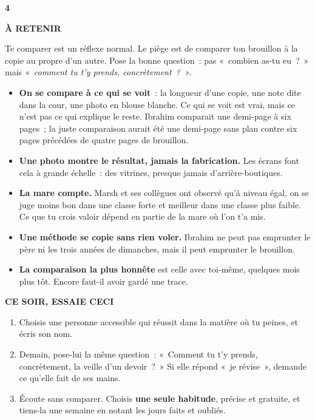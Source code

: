 \documentclass[10pt,twoside,openany]{book}
\newenvironment{aretenir}[1][À retenir]{\par\begin{tcolorbox}[enhanced,colback=creme,colframe=accent,boxrule=0pt,leftrule=3pt,arc=0pt,left=8pt,right=8pt,top=5pt,bottom=5pt,breakable]{\small\bfseries\color{accent}\MakeUppercase{#1}}\par\smallskip}{\end{tcolorbox}\par}
\newenvironment{cesoir}[1][Ce soir, essaie ceci]{\par\begin{tcolorbox}[enhanced,colback=white,colframe=vert,boxrule=0.6pt,arc=2pt,left=8pt,right=8pt,top=5pt,bottom=5pt,breakable]{\small\bfseries\color{vert}\MakeUppercase{#1}}\par\smallskip\small}{\end{tcolorbox}\par}
\newcommand{\fiche}[3]{\clearpage\markright{#2}\thispagestyle{plain}%
 {\noindent\color{accent}\fontsize{40}{40}\selectfont\bfseries #1}\hspace{0.6em}{\Large\bfseries #2\par}\vspace{0.1em}{\small\color{gris}\itshape #3\par}\vspace{0.5em}}
\begin{document}
\fiche{4}{Le cahier du voisin}{Chapitre 4 du livre}
\begin{aretenir}
Te comparer est un réflexe normal. Le piège est de comparer ton brouillon à la copie au propre d’un autre. Pose la bonne question : pas « combien as-tu eu ? » mais \emph{« comment tu t’y prends, concrètement ? »}.
\end{aretenir}
\begin{itemize}
\item \textbf{On se compare à ce qui se voit} : la longueur d’une copie, une note dite dans la cour, une photo en blouse blanche. Ce qui se voit est vrai, mais ce n’est pas ce qui explique le reste. Ibrahim comparait une demi-page à six pages ; la juste comparaison aurait été une demi-page sans plan contre six pages précédées de quatre pages de brouillon.
\item \textbf{Une photo montre le résultat, jamais la fabrication.} Les écrans font cela à grande échelle : des vitrines, presque jamais d’arrière-boutiques.
\item \textbf{La mare compte.} Marsh et ses collègues ont observé qu’à niveau égal, on se juge moins bon dans une classe forte et meilleur dans une classe plus faible. Ce que tu crois valoir dépend en partie de la mare où l’on t’a mis.
\item \textbf{Une méthode se copie sans rien voler.} Ibrahim ne peut pas emprunter le père ni les trois années de dimanches, mais il peut emprunter le brouillon.
\item \textbf{La comparaison la plus honnête} est celle avec toi-même, quelques mois plus tôt. Encore faut-il avoir gardé une trace.
\end{itemize}
\begin{cesoir}
\begin{enumerate}
\item Choisis une personne accessible qui réussit dans la matière où tu peines, et écris son nom.
\item Demain, pose-lui la même question : « Comment tu t’y prends, concrètement, la veille d’un devoir ? » Si elle répond « je révise », demande ce qu’elle fait de ses mains.
\item Écoute sans comparer. Choisis \textbf{une seule habitude}, précise et gratuite, et tiens-la une semaine en notant les jours faits et oubliés.
\end{enumerate}
\end{cesoir}
\end{document}
